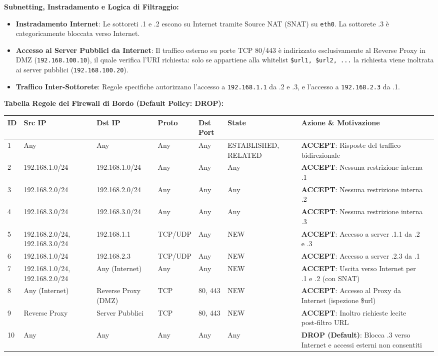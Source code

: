 \documentclass[11pt,a4paper]{article}
\begin{document}
\begin{solutionbox}
\textbf{Subnetting, Instradamento e Logica di Filtraggio:}
\begin{itemize}
    \item \textbf{Instradamento Internet}: Le sottoreti .1 e .2 escono su Internet tramite Source NAT (SNAT) su \texttt{eth0}. La sottorete .3 \`e categoricamente bloccata verso Internet.
    \item \textbf{Accesso ai Server Pubblici da Internet}: Il traffico esterno su porte TCP 80/443 \`e indirizzato esclusivamente al Reverse Proxy in DMZ (\texttt{192.168.100.10}), il quale verifica l'URI richiesta: solo se appartiene alla whitelist \texttt{\$url1, \$url2, ...} la richiesta viene inoltrata ai server pubblici (\texttt{192.168.100.20}).
    \item \textbf{Traffico Inter-Sottorete}: Regole specifiche autorizzano l'accesso a \texttt{192.168.1.1} da .2 e .3, e l'accesso a \texttt{192.168.2.3} da .1.
\end{itemize}

\textbf{Tabella Regole del Firewall di Bordo (Default Policy: DROP):}
\begin{center}
\small
\begin{tabularx}{\textwidth}{lllllllX}
\toprule
\textbf{ID} & \textbf{Src IP} & \textbf{Dst IP} & \textbf{Proto} & \textbf{Dst Port} & \textbf{State} & \textbf{Azione \& Motivazione} \\
\midrule
1 & Any & Any & Any & Any & ESTABLISHED, RELATED & \textbf{ACCEPT}: Risposte del traffico bidirezionale \\
2 & 192.168.1.0/24 & 192.168.1.0/24 & Any & Any & Any & \textbf{ACCEPT}: Nessuna restrizione interna .1 \\
3 & 192.168.2.0/24 & 192.168.2.0/24 & Any & Any & Any & \textbf{ACCEPT}: Nessuna restrizione interna .2 \\
4 & 192.168.3.0/24 & 192.168.3.0/24 & Any & Any & Any & \textbf{ACCEPT}: Nessuna restrizione interna .3 \\
5 & 192.168.2.0/24, 192.168.3.0/24 & 192.168.1.1 & TCP/UDP & Any & NEW & \textbf{ACCEPT}: Accesso a server .1.1 da .2 e .3 \\
6 & 192.168.1.0/24 & 192.168.2.3 & TCP/UDP & Any & NEW & \textbf{ACCEPT}: Accesso a server .2.3 da .1 \\
7 & 192.168.1.0/24, 192.168.2.0/24 & Any (Internet) & Any & Any & NEW & \textbf{ACCEPT}: Uscita verso Internet per .1 e .2 (con SNAT) \\
8 & Any (Internet) & Reverse Proxy (DMZ) & TCP & 80, 443 & NEW & \textbf{ACCEPT}: Accesso al Proxy da Internet (ispezione \$url) \\
9 & Reverse Proxy & Server Pubblici & TCP & 80, 443 & NEW & \textbf{ACCEPT}: Inoltro richieste lecite post-filtro URL \\
10 & Any & Any & Any & Any & Any & \textbf{DROP (Default)}: Blocca .3 verso Internet e accessi esterni non consentiti \\
\bottomrule
\end{tabularx}
\end{center}
\end{solutionbox}
\end{document}
